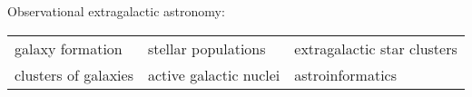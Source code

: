 Observational extragalactic astronomy:

\begin{tabularx}{\textwidth}{XXX}
galaxy formation & stellar populations & extragalactic star clusters \\
clusters of galaxies & active galactic nuclei & astroinformatics \\
\end{tabularx}
